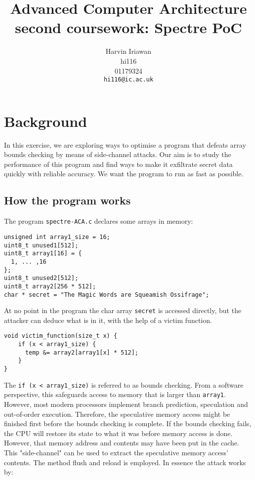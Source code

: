 \documentclass[10pt,twocolumn,letterpaper]{article}
\title{Advanced Computer Architecture second coursework: Spectre PoC}
\author{Harvin Iriawan\\
	hi116\\
	01179324\\
	{\tt\small hi116@ic.ac.uk}}
\begin{document}
\maketitle

\section{Background}

In this exercise, we are exploring ways to optimise a program that defeats array bounds checking by means of side-channel attacks. Our aim is to study the performance of this program and find ways to make it exfiltrate secret data quickly with reliable accuracy. We want the program to run as fast as possible.

\subsection{How the program works}
The program \texttt{spectre-ACA.c} declares some arrays in memory:
\begin{lstlisting}
unsigned int array1_size = 16;
uint8_t unused1[512];
uint8_t array1[16] = {
  1, ... ,16
};
uint8_t unused2[512];
uint8_t array2[256 * 512];
char * secret = "The Magic Words are Squeamish Ossifrage";
\end{lstlisting}
At no point in the program the char array \texttt{secret} is accessed directly, but the attacker can deduce what is in it, with the help of a victim function.
\begin{lstlisting}
void victim_function(size_t x) {
    if (x < array1_size) {
      temp &= array2[array1[x] * 512];
    }
}
\end{lstlisting}
The \lstinline{if (x < array1_size)} is referred to as bounds checking. From a software perspective, this safeguards access to memory that is larger than \texttt{array1}. However, most modern processors implement branch prediction, speculation and out-of-order execution. Therefore, the speculative memory access might be finished first before the bounds checking is complete. If the bounds checking fails, the CPU will restore its state to what it was before memory access is done.\\
However, that memory address and contents may have been put in the cache. This "side-channel" can be used to extract the speculative memory access' contents. The method flush and reload is employed. In essence the attack works by:
\end{document}
